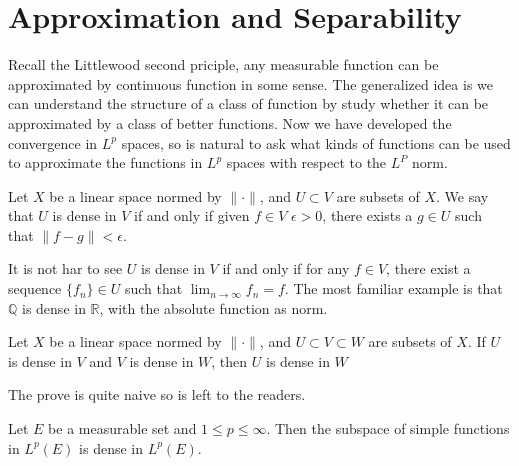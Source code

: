 \documentclass[lang=en, 12pt]{elegantbook}
\newcommand{\RR}{\mathbb{R}}
\newcommand{\QQ}{\mathbb{Q}}
\begin{document}
    \section{Approximation and Separability}
        Recall the Littlewood second priciple, any measurable function can be approximated by 
    continuous function in some sense. The generalized idea is we can understand the structure of 
    a class of function by study whether it can be approximated by a class of better functions. 
    Now we have developed the convergence in $L^p$ spaces, so is natural to ask what kinds of functions
    can be used to approximate the functions in $L^p$ spaces with respect to the $L^P$ norm. 
        \begin{definition}[Dense]
            Let $X$ be a linear space normed by $\lVert \cdot \rVert$, and $U \subset V$ are subsets of $X$. 
        We say that $U$ is dense in $V$ if and only if given $f \in V$ $\epsilon > 0$, there exists a
        $g \in U$ such that $\lVert f -g \rVert < \epsilon$.
        \end{definition}
        It is not har to see $U$ is dense in $V$ if and only if for any $f \in V$, there 
    exist a sequence $\{f_n\} \in U$ such that $\lim_{n \to \infty} f_n = f$. The most familiar
    example is that $\QQ$ is dense in $\RR$, with the absolute function as norm.
        \begin{proposition}\label{DenseTransitivity}
            Let $X$ be a linear space normed by $\lVert \cdot \rVert$, and $U \subset V \subset W$ are subsets of $X$. 
        If $U$ is dense in $V$ and $V$ is dense in $W$, then $U$ is dense in $W$
        \end{proposition}
        The prove is quite naive so is left to the readers.
        \begin{proposition}
            Let $E$ be a measurable set and $1\leq p\leq \infty$. Then the subspace of simple functions
        in $L^p(E)$ is dense in $L^p(E)$.
        \end{proposition}
\end{document}

